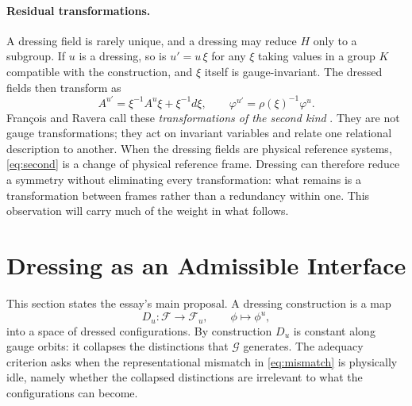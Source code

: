 \documentclass[11pt]{article}
\theoremstyle{plain}
\theoremstyle{definition}
\theoremstyle{remark}
\newcommand{\F}{\mathcal F}
\newcommand{\G}{\mathcal G}
\begin{document}
\paragraph{Residual transformations.} A dressing field is rarely unique, and a dressing may reduce $H$ only to a subgroup. If $u$ is a dressing, so is $u'=u\,\xi$ for any $\xi$ taking values in a group $K$ compatible with the construction, and $\xi$ itself is gauge-invariant. The dressed fields then transform as
\begin{equation}\label{eq:second}
A^{u'}=\xi^{-1}A^u\xi+\xi^{-1}d\xi,\qquad \varphi^{u'}=\rho(\xi)^{-1}\varphi^u .
\end{equation}
François and Ravera call these \emph{transformations of the second kind} \cite{fr-grf,ravera-notes}. They are not gauge transformations; they act on invariant variables and relate one relational description to another. When the dressing fields are physical reference systems, \eqref{eq:second} is a change of physical reference frame. Dressing can therefore reduce a symmetry without eliminating every transformation: what remains is a transformation between frames rather than a redundancy within one. This observation will carry much of the weight in what follows.

\section{Dressing as an Admissible Interface}\label{sec:interface}

This section states the essay's main proposal. A dressing construction is a map
\begin{equation}
D_u:\F\longrightarrow\F_u,\qquad \phi\longmapsto\phi^u,
\end{equation}
into a space of dressed configurations. By construction $D_u$ is constant along gauge orbits: it collapses the distinctions that $\G$ generates. The adequacy criterion asks when the representational mismatch in \eqref{eq:mismatch} is physically idle, namely whether the collapsed distinctions are irrelevant to what the configurations can become.
\end{document}
